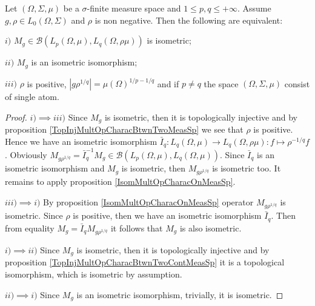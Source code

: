 \begin{proposition}\label{IsomMultOpCharacBtwnTwoContMeasSp} Let $(\Omega,\Sigma,\mu)$ be a $\sigma$-finite measure space and $1\leq p,q\leq +\infty$. Assume $g,\rho\in L_0(\Omega,\Sigma)$ and $\rho$ is non negative. Then the following are equivalent:

$i)$ $M_g\in\mathcal{B}(L_p(\Omega,\mu), L_q(\Omega,\rho \mu))$ is isometric;

$ii)$ $M_g$ is an isometric isomorphism;

$iii)$ $\rho$ is positive, $|g  \rho^{1/q}|=\mu(\Omega)^{1/p-1/q}$ and if $p\neq q$ the space $(\Omega,\Sigma,\mu)$ consist of single atom.
\end{proposition}
\begin{proof} $i)$$\implies$$ iii)$ Since $M_g$ is isometric, then it is topologically injective and by proposition \ref{TopInjMultOpCharacBtwnTwoMeasSp} we see that $\rho$ is positive. Hence we have an isometric isomorphism $\bar{I}_q:L_q(\Omega,\mu)\to L_q(\Omega,\rho \mu):f\mapsto \rho^{-1/q}  f$. Obviously $M_{g \rho^{1/q}}=\bar{I}_q^{-1} M_g\in\mathcal{B}(L_p(\Omega,\mu),L_q(\Omega,\mu))$. Since $\bar{I}_q$ is an isometric isomorphism and $M_g$ is isometric, then $M_{g  \rho^{1/q}}$ is isometric too. It remains to apply proposition \ref{IsomMultOpCharacOnMeasSp}.

$iii)$$\implies$$ i)$ By proposition \ref{IsomMultOpCharacOnMeasSp} operator $M_{g \rho^{1/q}}$ is isometric. Since $\rho$ is positive, then we have an isometric isomorphism $\bar{I}_q$. Then from equality $M_g=\bar{I}_q M_{g \rho^{1/q}}$ it follows that $M_g$ is also isometric.

$i)$$\implies$$ ii)$ Since $M_g$ is isometric, then it is topologically injective and by proposition \ref{TopInjMultOpCharacBtwnTwoContMeasSp} it is a topological isomorphism, which is isometric by assumption.

$ii)$$\implies$$ i)$ Since $M_g$ is an isometric isomorphism, trivially, it is isometric.
\end{proof}

